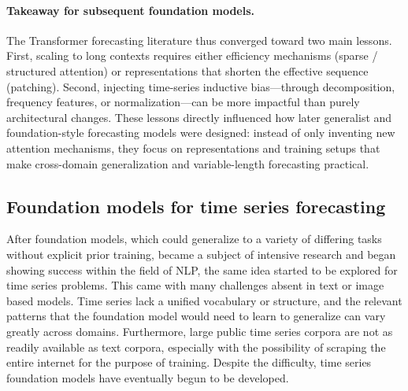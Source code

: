 \paragraph{Takeaway for subsequent foundation models.}
The Transformer forecasting literature thus converged toward two main lessons. First, scaling to long contexts requires either efficiency mechanisms (sparse / structured attention) or representations that shorten the effective sequence (patching). Second, injecting time-series inductive bias---through decomposition, frequency features, or normalization---can be more impactful than purely architectural changes. These lessons directly influenced how later generalist and foundation-style forecasting models were designed: instead of only inventing new attention mechanisms, they focus on representations and training setups that make cross-domain generalization and variable-length forecasting practical.

\subsection{Foundation models for time series forecasting}

After foundation models, which could generalize to a variety of differing tasks without explicit prior training, became a subject of intensive research and began showing success within the field of NLP, the same idea started to be explored for time series problems. This came with many challenges absent in text or image based models. Time series lack a unified vocabulary or structure, and the relevant patterns that the foundation model would need to learn to generalize can vary greatly across domains. Furthermore, large public time series corpora are not as readily available as text corpora, especially with the possibility of scraping the entire internet for the purpose of training. Despite the difficulty, time series foundation models have eventually begun to be developed.

